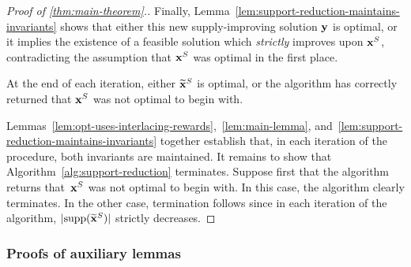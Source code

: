 \documentclass[12pt]{article}
\begin{document}
\begin{proof}[Proof of \cref{thm:main-theorem}.]
{Finally,} {Lemma~\ref{lem:support-reduction-maintains-invariants}} shows that either this new supply-improving solution $\mathbf{y}$ is optimal, or it implies the existence of a feasible solution which {\it strictly} improves upon $\mathbf{x}^S$, contradicting the assumption that $\mathbf{x}^S$ was optimal in the first place.
\begin{lemma}\label{lem:support-reduction-maintains-invariants}
At the end of each iteration, either $\widetilde{\mathbf{x}}^S$ is optimal, or the algorithm has correctly returned that $\mathbf{x}^S$ was not optimal to begin with.
\end{lemma}

Lemmas~\ref{lem:opt-uses-interlacing-rewards},~\ref{lem:main-lemma}, and~\ref{lem:support-reduction-maintains-invariants} together establish that, in each iteration of the procedure, both invariants are maintained. {It remains to show that Algorithm~\ref{alg:support-reduction} terminates. Suppose first that the algorithm returns that~$\mathbf{x}^S$ was not optimal to begin with. In this case, the algorithm clearly terminates. In the other case, termination follows since in each iteration of the algorithm, $|\text{supp}(\widetilde{\mathbf{x}}^S)|$ strictly decreases.}
\end{proof}

\subsubsection{Proofs of auxiliary lemmas}\label{apx:main-thm-aux-lemmas}

\end{document}
